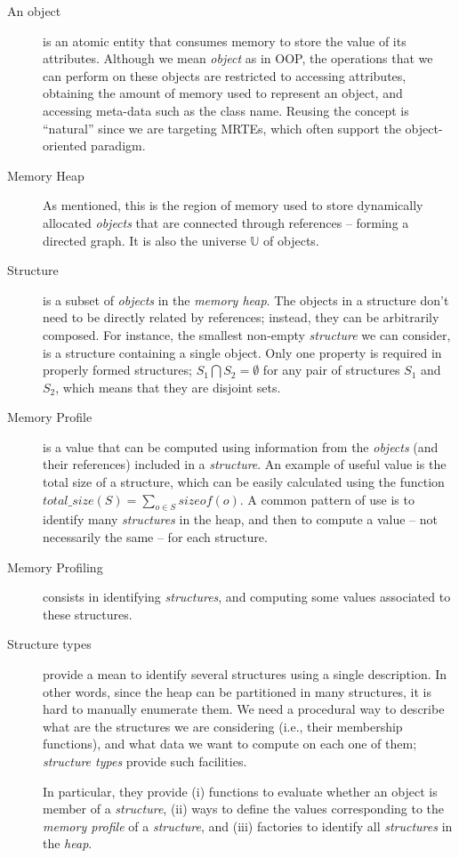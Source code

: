 \begin{description}
\item[An object] is an atomic entity that consumes memory to store the value of its attributes.
Although we mean \textit{object} as in \gls{OOP}, the operations that we can perform on these objects are restricted to accessing attributes, obtaining the amount of memory used to represent an object, and accessing meta-data such as the class name.
Reusing the concept is ``natural'' since we are targeting MRTEs, which often support the object-oriented paradigm.

\item[Memory Heap] As mentioned, this is the region of memory used to store dynamically allocated \textit{objects} that are connected through references -- forming a directed graph.
It is also the universe $\mathbb{U}$ of objects.

\item[Structure] is a subset of \textit{objects} in the \textit{memory heap}.
The objects in a structure don't need to be directly related by references; instead, they can be arbitrarily composed.
For instance, the smallest non-empty \textit{structure} we can consider, is a structure containing a single object.
Only one property is required in properly formed structures;  $S_1 \bigcap S_2 = \emptyset$ for any pair of structures $S_1$ and $S_2$, which means that they are disjoint sets.

\item[Memory Profile] is a value that can be computed using information from the \textit{objects} (and their references) included in a \textit{structure}.
An example of useful value is the total size of a structure, which can be easily calculated using the function $\textit{total\_size}\left(S\right) = \sum_{o \in S} {sizeof(o)}$.
A common pattern of use is to identify many \textit{structures} in the heap, and then to compute a value -- not necessarily the same -- for each structure.

\item[Memory Profiling] consists in identifying \textit{structures}, and computing some values associated to these structures. 

\item[Structure types] provide a mean to identify several structures using a single description.
In other words, since the heap can be partitioned in many structures, it is hard to manually enumerate them.
We need a procedural way to describe what are the structures we are considering (i.e., their membership functions), and what data we want to compute on each one of them; \textit{structure types} provide such facilities.

In particular, they provide (i) functions to evaluate whether an object is member of a \textit{structure}, (ii) ways to define the values corresponding to the \textit{memory profile} of a \textit{structure}, and (iii) factories to identify all \textit{structures} in the \textit{heap}.

\end{description}

